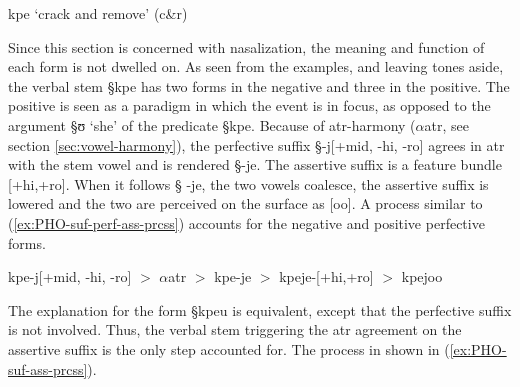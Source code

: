 \begin{table}[!htb]
\centering
\caption{kpe `crack
and remove' (c\&r)  \label{tab:crack-remove}}

\quad
{}
\end{table}


Since this section is concerned with nasalization, the
meaning and
function of each form is not dwelled on. As
seen from the examples, and leaving tones aside, the
verbal stem {\S kpe} has two forms in the negative and three in the positive.
The positive is seen as a paradigm in which the event is in focus, as opposed
to the argument {\S ʊ} `she' of the predicate {\S kpe}. Because of
{\sc atr}-harmony ($\alpha${\sc atr}, see section \ref{sec:vowel-harmony}), the
perfective suffix {\S -j[{\sc +mid,
-hi, -ro}]} agrees in {\sc atr} with the stem vowel and is rendered {\S -je}.
The assertive suffix is a feature bundle [{\sc +hi,+ro}]. When it follows {\S
-je}, the two vowels coalesce, the assertive suffix is lowered and the two are
perceived on the surface as [oo]. A process similar to 
(\ref{ex:PHO-suf-perf-ass-prcss})  accounts for the negative and
positive 
perfective forms.

\begin{exe}
\ex\label{ex:PHO-suf-perf-ass-prcss}
kpe-j[{\sc +mid, -hi, -ro}]  $>$ $\alpha${\sc atr} $>$ kpe-je  $>$
kpeje-[{\sc +hi,+ro}]  $>$ kpejoo
\end{exe}

The explanation for the form {\S kpeu} is equivalent, except that the
perfective suffix is not involved. Thus,  the verbal stem triggering the {\sc
atr} agreement on the assertive suffix is the only step  accounted
for. The process in shown in (\ref{ex:PHO-suf-ass-prcss}).


